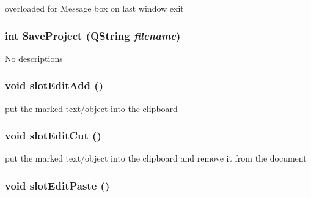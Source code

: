 overloaded for Message box on last window exit \hypertarget{class_bxbuilder_app_d1ce6732a3a8cf0b96c172e8992529b1}{
\subsubsection[{SaveProject}]{\setlength{\rightskip}{0pt plus 5cm}int SaveProject (QString {\em filename})}}
\label{class_bxbuilder_app_d1ce6732a3a8cf0b96c172e8992529b1}


No descriptions \hypertarget{class_bxbuilder_app_ad899f797245ea9ad0763fcdd2a5d142}{
\subsubsection[{slotEditAdd}]{\setlength{\rightskip}{0pt plus 5cm}void slotEditAdd ()}}
\label{class_bxbuilder_app_ad899f797245ea9ad0763fcdd2a5d142}


put the marked text/object into the clipboard \hypertarget{class_bxbuilder_app_cbc7ffdff53872039965f218541ad47a}{
\subsubsection[{slotEditCut}]{\setlength{\rightskip}{0pt plus 5cm}void slotEditCut ()}}
\label{class_bxbuilder_app_cbc7ffdff53872039965f218541ad47a}


put the marked text/object into the clipboard and remove it from the document \hypertarget{class_bxbuilder_app_77bb016165058a8b1b40d0379c0d257a}{
\subsubsection[{slotEditPaste}]{\setlength{\rightskip}{0pt plus 5cm}void slotEditPaste ()}}
\label{class_bxbuilder_app_77bb016165058a8b1b40d0379c0d257a}


